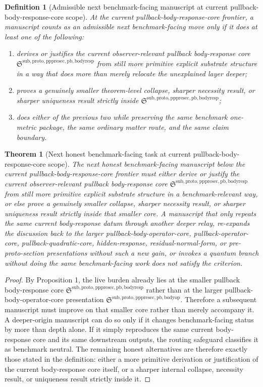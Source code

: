 \documentclass[11pt]{article}
\newcommand{\PullbackBodyOperatorCore}{\mathfrak S^{\mathrm{sub,proto,pppresec,pb,bodyop}}}
\newcommand{\PullbackBodyResponseCore}{\mathfrak S^{\mathrm{sub,proto,pppresec,pb,bodyresp}}}
\newtheorem{definition}{Definition}
\newtheorem{theorem}{Theorem}
\begin{document}
\begin{definition}[Admissible next benchmark-facing manuscript at current pullback-body-response-core scope]
At the current pullback-body-response-core frontier, a manuscript counts as an admissible next benchmark-facing move only if it does at least one of the following:
\begin{enumerate}
    \item derives or justifies the current observer-relevant pullback body-response core \(\PullbackBodyResponseCore\) from still more primitive explicit substrate structure in a way that does more than merely relocate the unexplained layer deeper;
    \item proves a genuinely smaller theorem-level collapse, sharper necessity result, or sharper uniqueness result strictly inside \(\PullbackBodyResponseCore\);
    \item does either of the previous two while preserving the same benchmark one-metric package, the same ordinary matter route, and the same claim boundary.
\end{enumerate}
\end{definition}

\begin{theorem}[Next honest benchmark-facing task at current pullback-body-response-core scope]
The next honest benchmark-facing manuscript below the current pullback-body-response-core frontier must either derive or justify the current observer-relevant pullback body-response core \(\PullbackBodyResponseCore\) from still more primitive explicit substrate structure in a benchmark-relevant way, or else prove a genuinely smaller collapse, sharper necessity result, or sharper uniqueness result strictly inside that smaller core. A manuscript that only repeats the same current body-response datum through another deeper relay, re-expands the discussion back to the larger pullback-body-operator-core, pullback-operator-core, pullback-quadratic-core, hidden-response, residual-normal-form, or pre-proto-section presentations without such a new gain, or invokes a quantum branch without doing the same benchmark-facing work does not satisfy the criterion.
\end{theorem}

\begin{proof}
By Proposition 1, the live burden already lies at the smaller pullback body-response core \(\PullbackBodyResponseCore\) rather than at the larger pullback-body-operator-core presentation \(\PullbackBodyOperatorCore\). Therefore a subsequent manuscript must improve on that smaller core rather than merely accompany it. A deeper-origin manuscript can do so only if it changes benchmark-facing status by more than depth alone. If it simply reproduces the same current body-response core and its same downstream outputs, the routing safeguard classifies it as benchmark neutral. The remaining honest alternatives are therefore exactly those stated in the definition: either a more primitive derivation or justification of the current body-response core itself, or a sharper internal collapse, necessity result, or uniqueness result strictly inside it.
\end{proof}
\end{document}
